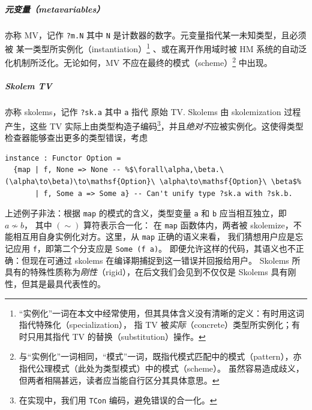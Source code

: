 {\setlength{\parskip}{-1em}
  \subparagraph{元变量（metavariables）} 亦称 MV，记作 \texttt{?m.N} 其中 \texttt{N} 是计数器的数字。元变量指代某一未知类型，且必须被
  某一类型所实例化（instantiation）\footnote{
    “实例化”一词在本文中经常使用，但其具体含义没有清晰的定义：有时用这词指代特殊化（specialization），
    指 TV 被\emph{实际}（concrete）类型所实例化；有时只用其指代 TV 的替换（substitution）操作。
  }
  、或在离开作用域时被 HM 系统的自动泛化机制所泛化。无论如何，MV 不应在最终的模式（scheme）\footnote{
    与“实例化”一词相同，“模式”一词，既指代模式匹配中的模式（pattern），亦指代公理模式（此处为类型模式）中的模式（scheme）。
    虽然容易造成歧义，但两者相隔甚远，读者应当能自行区分其具体意思。
  }
  中出现。

  \subparagraph{Skolem TV} 亦称 skolems，记作 \texttt{?sk.a} 其中 \texttt{a} 指代
  原始 TV. Skolems 由 skolemization 过程产生，这些 TV 实际上由类型构造子编码\footnote{在实现中，我们用 \texttt{TCon} 编码，避免错误的合一化。}，并且\emph{绝对不}应被实例化。这使得类型检查器能够查出更多的类型错误，考虑
}
\begin{verbatim}
instance : Functor Option =
  {map | f, None => None -- %$\forall\alpha,\beta.\ (\alpha\to\beta)\to\mathsf{Option}\ \alpha\to\mathsf{Option}\ \beta$%
       | f, Some a => Some a} -- Can't unify type ?sk.a with ?sk.b.
\end{verbatim}

上述例子非法：根据 \texttt{map} 的模式的含义，类型变量 \texttt{a} 和 \texttt{b} 应当相互独立，即 $a \not\sim b$，
其中 $(\sim)$ 算符表示合一化：
在 \texttt{map} 函数体内，两者被 skolemize，不能相互用自身实例化对方。这里，从 \texttt{map} 正确的语义来看，
我们猜想用户应是忘记应用 \texttt{f}，即第二个分支应是 \texttt{Some (f a)}。
即便允许这样的代码，其语义也不正确：但现在可通过 skolems 在编译期捕捉到这一错误并回报给用户。
Skolems 所具有的特殊性质称为\emph{刚性}（rigid），在后文我们会见到不仅仅是 Skolems 具有刚性，但其是最具代表性的。

